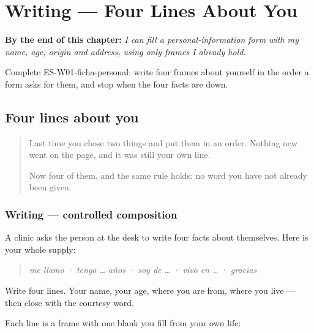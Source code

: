 
\chapter{Writing --- Four Lines About You}
\label{ch:escribir-ficha-personal}

\begin{chapteropening}
\textbf{By the end of this chapter:} \emph{I can fill a personal-information form with my name, age, origin and address, using only frames I already hold.}

Complete ES-W01-ficha-personal: write four frames about yourself in the order a form asks for them, and stop when the four facts are down.
\end{chapteropening}

\section[Practice]{Four lines about you}

\label{lesson:ES-W01-ficha-personal}



\begin{quote}
Last time you chose two things and put them in an order. Nothing new went on the page, and it was still your own line.

Now four of them, and the same rule holds: no word you have not already been given.
\end{quote}

\subsection*{Writing — controlled composition}
A clinic asks the person at the desk to write four facts about themselves. Here is your whole supply:

\begin{quote}
\emph{me llamo} · \emph{tengo … años} · \emph{soy de …} · \emph{vivo en …} · \emph{gracias}
\end{quote}

Write four lines. Your name, your age, where you are from, where you live — then close with the courtesy word.

Each line is a frame with one blank you fill from your own life:

